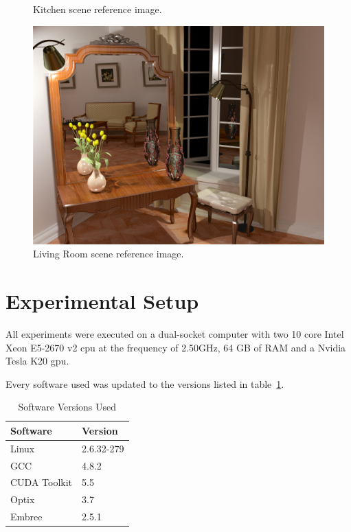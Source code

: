 \begin{figure}[h]
\begin{minipage}[b]{0.3\linewidth}
\caption{\label{img:kitchen_ref} Kitchen scene reference image.}
\end{minipage}
\quad
\begin{minipage}[b]{0.3\linewidth}
\includegraphics[width=\linewidth]{img/livingroom_ref.jpg}
\caption{\label{img:livingroom_ref} Living Room scene reference image.}
\end{minipage}

\end{figure}

\section{Experimental Setup}

All experiments were executed on a dual-socket computer with two 10 core Intel Xeon E5-2670 v2 \gls{cpu} at the frequency of 2.50GHz, 64 GB of RAM and a Nvidia Tesla K20 \gls{gpu}.

Every software used was updated to the versions listed in table~\ref{tab:soft_ver}.

\begin{table}[h]
\centering
\begin{tabular}{|l|l|}

\hline
Software & Version \\
\hline
Linux & 2.6.32-279 \\
\hline
GCC & 4.8.2 \\
\hline
CUDA Toolkit & 5.5 \\
\hline
Optix & 3.7 \\
\hline
Embree & 2.5.1 \\
\hline

\end{tabular}
\caption{\label{tab:soft_ver} Software Versions Used}
\end{table}

